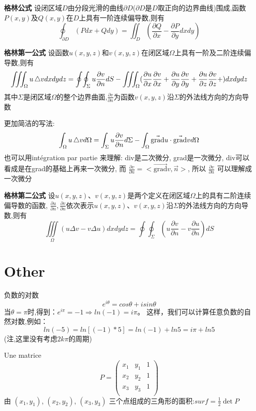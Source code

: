 \documentclass{book}
\begin{document}
\bigskip
\textbf{格林公式}
设闭区域$D$由分段光滑的曲线$\partial D$($\partial D$是$D$取正向的边界曲线)围成,函数$P(x,y)$及$Q(x,y)$在$D$上具有一阶连续偏导数,则有
$$\oint_{\partial D} (Pdx+Qdy) = \iint_D (\frac{\partial Q}{\partial x} - \frac{\partial  P}{\partial y}dxdy)$$

\bigskip
\textbf{格林第一公式}
设函数$u(x,y,z)$和$v(x,y,z)$在闭区域$\Omega$上具有一阶及二阶连续偏导数,则有
$$\iiint_{\Omega} u\mathop{}\!\mathbin\bigtriangleup v dxdydz
=
\oint\!\oint_{\Sigma} u \frac{\partial v}{\partial n}dS -
\iiint_{\Omega}(
\frac{\partial  u}{\partial x}\frac{\partial v}{\partial x}+
\frac{\partial  u}{\partial y}\frac{\partial v}{\partial y}+
\frac{\partial  u}{\partial z}\frac{\partial v}{\partial z}+
)dxdydz$$
其中$\Sigma$是闭区域$\Omega$的整个边界曲面,$\frac{\partial v}{\partial n}$为函数$v(x,y,z)$沿$\Sigma$的外法线方向的方向导数

更加简洁的写法:
$$ \int_{\Omega}u \mathop{}\!\mathbin\bigtriangleup v d\Omega = \int_{\Sigma}u \frac{\partial v}{\partial n}d\Sigma - \int_{\Omega} \vec{\mbox{grad}}u \cdot \vec{\mbox{grad}} v d\Omega $$
也可以用int\'egration par partie 来理解:
div是二次微分, grad是一次微分, div可以看成是在grad的基础上再来一次微分, 而
$ \frac{\partial  v}{\partial n} = <\vec{\mbox{grad}} v,\vec{n}>$, 所以
$\frac{\partial  v}{\partial n}$ 可以理解成一次微分

\bigskip
\textbf{格林第二公式}
设$u(x,y,z)$、$v(x,y,z)$是两个定义在闭区域$\Omega$上的具有二阶连续偏导数的函数,
$\frac{\partial u}{\partial n},\frac{\partial v}{\partial n}$依次表示$u(x,y,z)$、$v(x,y,z)$沿$\Sigma$的外法线方向的方向导数,则有
$$\iiint\limits_{\Omega}(u\Delta v - v\Delta u)dxdydz=\oint\!\oint_{\Sigma}(u \frac{\partial v}{\partial n}-v\frac{\partial u}{\partial n})dS$$

\section{Other}
负数的对数
$$e^{i\theta}=cos\theta+isin\theta$$
当$\theta=\pi$时,得到：$e^{i\pi}=-1\Rightarrow ln(-1)=i\pi$。
这样，我们可以计算任意负数的自然对数,例如：
$$ln(-5)=ln[(-1)*5]=ln(-1)+ln5=i\pi+ln5$$
(注,这里没有考虑$2k\pi$的周期)

Une matrice
$$
P=
\left(
             \begin{array}{ccc}
               x_1 & y_1 & 1 \\
               x_2 & y_2 & 1 \\
               x_3 & y_3 & 1 \\
             \end{array}
          \right)
$$
由 $(x_1,y_1)$, $(x_2,y_2)$, $(x_3,y_3)$ 三个点组成的三角形的面积:$surf = \frac{1}{2}\det{P}$
\end{document}
